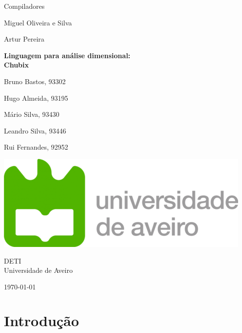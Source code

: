 \documentclass[10pt,portuguese]{article}
\begin{document}
\begin{titlepage}
	\clearpage\thispagestyle{empty}
	\centering
	\vspace{2cm}

	
	{\Large  Compiladores \par}
	\vspace{0.5cm}
	{\small Miguel Oliveira e Silva\par
	Artur Pereira\par}
	\vspace{3cm}
	{\huge \textbf{Linguagem para análise dimensional: \\ Chubix}}
	\vspace{1cm}
	\vspace{4cm}
	{\normalsize  \par Bruno Bastos, 93302 \par 
	Hugo Almeida, 93195 \par
	Mário Silva, 93430
	\par Leandro Silva, 93446 
	   \par Rui Fernandes, 92952}
	 
	\vspace{2cm}

    \includegraphics[scale=0.20]{images/logo_ua.png}
    
    \vspace{2cm}
    
	{\normalsize DETI \\ 
		Universidade de Aveiro \par}
		
	{\normalsize \today \par}
	\vspace{2cm}
		
	
	\pagebreak

\end{titlepage}
\tableofcontents{}
\clearpage

\section{Introdução}
\end{document}

